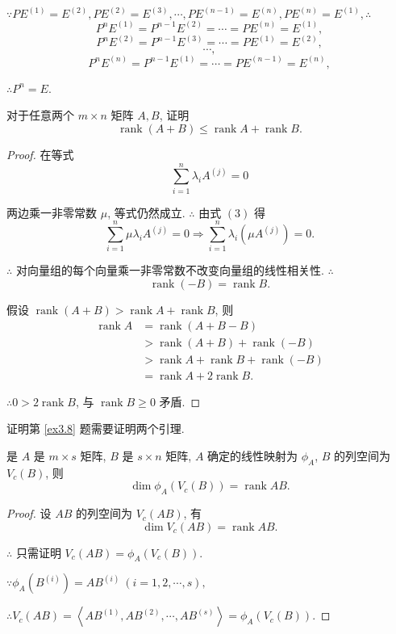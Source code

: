\documentclass{ctexart}
\begin{document}
\begin{solution}
    $\because PE^{(1)}=E^{(2)},PE^{(2)}=E^{(3)},\cdots,PE^{(n-1)}=E^{(n)},PE^{(n)}=E^{(1)},\therefore$
    \[P^{n}E^{(1)}=P^{n-1}E^{(2)}=\cdots=PE^{(n)}=E^{(1)},\]
    \[P^{n}E^{(2)}=P^{n-1}E^{(3)}=\cdots=PE^{(1)}=E^{(2)},\]
    \[\cdots,\]
    \[P^{n}E^{(n)}=P^{n-1}E^{(1)}=\cdots=PE^{(n-1)}=E^{(n)},\]

    $\therefore P^n=E$.
\end{solution}
\begin{exercise}%
    对于任意两个 $m\times n$ 矩阵 $A,B$, 证明
    \[\operatorname{rank}(A+B)\leq\operatorname{rank}A+\operatorname{rank}B.\]
\end{exercise}
\begin{proof}
    在等式
    \begin{equation}
        \sum\limits_{i=1}^n\lambda_iA^{(j)}=0
    \end{equation}

    两边乘一非零常数 $\mu$, 等式仍然成立. $\therefore$ 由式 $(3)$ 得
    \[\sum\limits_{i=1}^n\mu\lambda_iA^{(j)}=0\Rightarrow\sum\limits_{i=1}^n\lambda_i(\mu A^{(j)})=0.\]

    $\therefore$ 对向量组的每个向量乘一非零常数不改变向量组的线性相关性. $\therefore$
    \[\operatorname{rank}(-B)=\operatorname{rank}B.\]

    假设 $\operatorname{rank}(A+B)>\operatorname{rank}A+\operatorname{rank}B$, 则
    \begin{align*}
        \operatorname{rank}A & =\operatorname{rank}(A+B-B) \\
        & >\operatorname{rank}(A+B)+\operatorname{rank}(-B) \\
        & >\operatorname{rank}A+\operatorname{rank}B+\operatorname{rank}(-B) \\
        & =\operatorname{rank}A+2\operatorname{rank}B.
    \end{align*}

    $\therefore 0>2\operatorname{rank}B$, 与 $\operatorname{rank}B\geq0$ 矛盾.
\end{proof}
证明第 \ref{ex3.8} 题需要证明两个引理.
\begin{lemma}\label{l4.2}
    是 $A$ 是 $m\times s$ 矩阵, $B$ 是 $s\times n$ 矩阵, $A$ 确定的线性映射为 $\phi_A$, $B$ 的列空间为 $V_c(B)$, 则
    \[\dim\phi_A(V_c(B))=\operatorname{rank}AB.\]
\end{lemma}
\begin{proof}
    设 $AB$ 的列空间为 $V_c(AB)$, 有
    \[\dim V_c(AB)=\operatorname{rank}AB.\]

    $\therefore$ 只需证明 $V_c(AB)=\phi_A(V_c(B))$.

    $\because\phi_A(B^{(i)})=AB^{(i)}\ (i=1,2,\cdots,s),$

    $\therefore V_c(AB)=\left<AB^{(1)},AB^{(2)},\cdots,AB^{(s)}\right>=\phi_A(V_c(B))$.
\end{proof}
\end{document}
